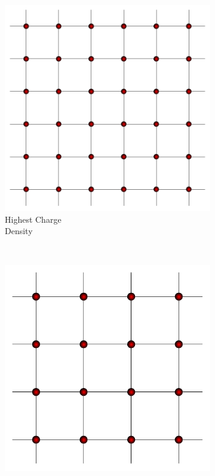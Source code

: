 \documentclass[10pt,letterpaper]{article}
\begin{document}
\begin{figure}[h!]%
	\centering
	\begin{subfigure}[b]{0.30\textwidth}
		\centering
		\includegraphics[scale=0.35]{squarelatticeDense.pdf}
		\caption{Highest Charge \\Density}
		\label{fig:gull}
	\end{subfigure}~~~~~~~~~~~
	\begin{subfigure}[b]{0.30\textwidth}
		\centering
		\includegraphics[scale=0.53]{squarelatticeMid.pdf}

\end{subfigure}
\end{figure}
\end{document}
